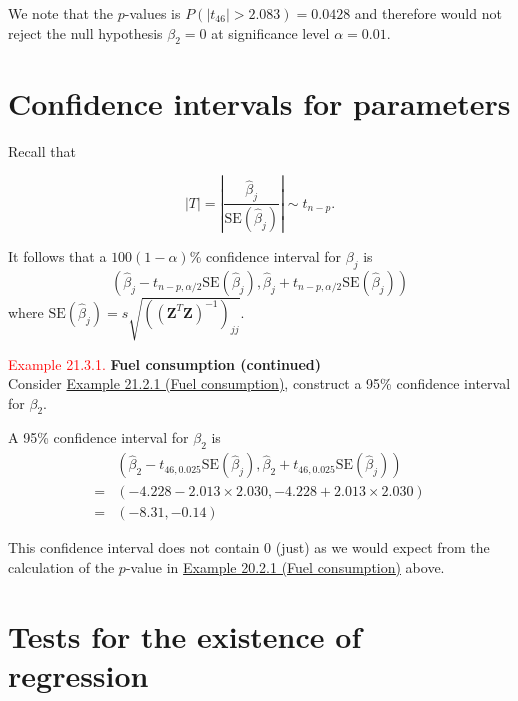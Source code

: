 \documentclass[
]{book}
\begin{document}
We note that the \(p\)-values is \(P(|t_{46}|>2.083) = 0.0428\) and therefore would not reject the null hypothesis \(\beta_2 =0\) at significance level \(\alpha = 0.01\).

\hypertarget{Sec_Linear_hypo_test:CI}{%
\section{Confidence intervals for parameters}\label{Sec_Linear_hypo_test:CI}}

Recall that

\[|T| = \left| \frac{ \hat{\beta}_j}{\text{SE}(\hat{\beta}_j)} \right| \sim t_{n-p}.\]

It follows that a \(100(1-\alpha)\%\) confidence interval for \(\beta_j\) is\\

\[\left( \hat{\beta}_j - t_{n-p,\alpha/2}\text{SE}(\hat{\beta}_j), \hat{\beta}_j + t_{n-p,\alpha/2}\text{SE}(\hat{\beta}_j) \right)\]
where \(\text{SE}(\hat{\beta}_j) = s \sqrt{((\mathbf{Z}^T\mathbf{Z})^{-1})_{jj}}\).

\leavevmode{}%
\textcolor{red}{Example 21.3.1.}
{\textbf{Fuel consumption (continued)}}\\
Consider \protect\hyperlink{Sec_Linear_hypo_test:ex:fuel_ex}{Example 21.2.1 (Fuel consumption)}, construct a 95\% confidence interval for \(\beta_2\).

\hfill\break

A 95\% confidence interval for \(\beta_2\) is\\

\begin{align*}
&\left( \hat{\beta}_2 - t_{46,0.025}\text{SE}(\hat{\beta}_j), \hat{\beta}_2 + t_{46,0.025}\text{SE}(\hat{\beta}_j) \right) \\[3pt]
= &\left( -4.228 - 2.013 \times 2.030, -4.228 + 2.013 \times 2.030 \right) \\[3pt]
= &\left(-8.31,-0.14 \right)
\end{align*}

This confidence interval does not contain 0 (just) as we would expect from the calculation of the \(p\)-value in \protect\hyperlink{Sec_Linear_hypo_test:ex:fuel_ex}{Example 20.2.1 (Fuel consumption)} above.

\hypertarget{Sec_Linear_hypo_test:F}{%
\section{Tests for the existence of regression}\label{Sec_Linear_hypo_test:F}}
\end{document}
